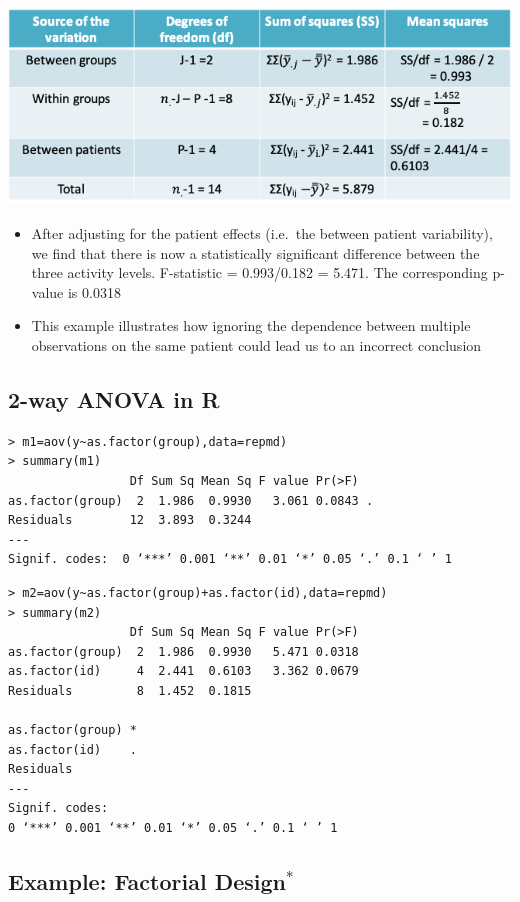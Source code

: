 \documentclass[
]{book}
\providecommand{\tightlist}{%
  \setlength{\itemsep}{0pt}\setlength{\parskip}{0pt}}
\begin{document}
\includegraphics[width=1\linewidth]{./11_18}

\begin{itemize}
\tightlist
\item
  After adjusting for the patient effects (i.e.~the between patient variability), we find that there is now a statistically significant difference between the three activity levels. F-statistic = 0.993/0.182 = 5.471. The corresponding p-value is 0.0318
\item
  This example illustrates how ignoring the dependence between multiple observations on the same patient could lead us to an incorrect conclusion
\end{itemize}

\hypertarget{way-anova-in-r}{%
\subsection{2-way ANOVA in R}\label{way-anova-in-r}}

\begin{verbatim}
> m1=aov(y~as.factor(group),data=repmd)
> summary(m1)
                 Df Sum Sq Mean Sq F value Pr(>F)  
as.factor(group)  2  1.986  0.9930   3.061 0.0843 .
Residuals        12  3.893  0.3244                 
---
Signif. codes:  0 ‘***’ 0.001 ‘**’ 0.01 ‘*’ 0.05 ‘.’ 0.1 ‘ ’ 1
\end{verbatim}

\begin{verbatim}
> m2=aov(y~as.factor(group)+as.factor(id),data=repmd)
> summary(m2)
                 Df Sum Sq Mean Sq F value Pr(>F)
as.factor(group)  2  1.986  0.9930   5.471 0.0318
as.factor(id)     4  2.441  0.6103   3.362 0.0679
Residuals         8  1.452  0.1815               
                  
as.factor(group) *
as.factor(id)    .
Residuals         
---
Signif. codes:  
0 ‘***’ 0.001 ‘**’ 0.01 ‘*’ 0.05 ‘.’ 0.1 ‘ ’ 1
\end{verbatim}

\hypertarget{example-factorial-design}{%
\subsection{\texorpdfstring{Example: Factorial Design\(^*\)}{Example: Factorial Design\^{}*}}\label{example-factorial-design}}
\end{document}

